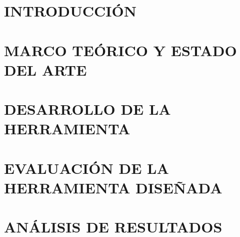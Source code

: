 \documentclass[12pt]{article}
\begin{document}
\clearpage %
\section{INTRODUCCIÓN} 



\clearpage



\newpage
\section{MARCO TEÓRICO Y ESTADO DEL ARTE} 
    

%     

\newpage
\section{DESARROLLO DE LA HERRAMIENTA} 
    

\newpage
\section{EVALUACIÓN DE LA HERRAMIENTA DISEÑADA} 
    

%     

\newpage
\section{ANÁLISIS DE RESULTADOS} 
    
\end{document}

